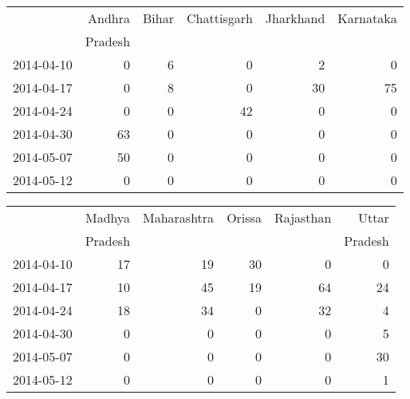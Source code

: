 \begin{tabular}{rrrrrr}
  \hline
 & Andhra  & Bihar & Chattisgarh & Jharkhand & Karnataka  \\ 
 &  Pradesh &  &  &  &  \\ 
  \hline
2014-04-10 &   0 &   6 &   0 &   2 &   0   \\ 
  2014-04-17 &   0 &   8 &   0 &  30 &  75  \\ 
  2014-04-24 &   0 &   0 &  42 &   0 &   0  \\ 
  2014-04-30 &  63 &   0 &   0 &   0 &   0  \\ 
  2014-05-07 &  50 &   0 &   0 &   0 &   0  \\ 
  2014-05-12 &   0 &   0 &   0 &   0 &   0  \\ 
   \hline
\end{tabular}
\medskip
\begin{tabular}{rrrrrr}
  \hline
 & Madhya  & Maharashtra & Orissa & Rajasthan & Uttar  \\ 
 &  Pradesh &  &  &  &  Pradesh \\ 
  \hline
2014-04-10 &  17 &  19 &  30 &   0 &   0 \\ 
  2014-04-17 &   10 &  45 &  19 &  64 &  24 \\ 
  2014-04-24 &   18 &  34 &   0 &  32 &   4 \\ 
  2014-04-30 &    0 &   0 &   0 &   0 &   5 \\ 
  2014-05-07 &    0 &   0 &   0 &   0 &  30 \\ 
  2014-05-12 &   0 &   0 &   0 &   0 &   1 \\ 
   \hline
\end{tabular}


